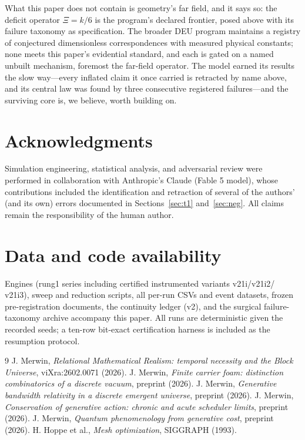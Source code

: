 \documentclass[11pt]{article}
\begin{document}
What this paper does not contain is geometry's far field, and it says so: the
deficit operator $\Xi=k/6$ is the program's declared frontier, posed above
with its failure taxonomy as specification. The broader DEU program maintains
a registry of conjectured dimensionless correspondences with measured
physical constants; none meets this paper's evidential standard, and each is
gated on a named unbuilt mechanism, foremost the far-field operator. The
model earned its results the slow way---every inflated claim it once carried
is retracted by name above, and its central law was found by three
consecutive registered failures---and the surviving core is, we believe,
worth building on.

\section*{Acknowledgments}
Simulation engineering, statistical analysis, and adversarial review were
performed in collaboration with Anthropic's Claude (Fable 5 model), whose
contributions included the identification and retraction of several of the
authors' (and its own) errors documented in Sections~\ref{sec:t1}
and~\ref{sec:neg}. All claims remain the responsibility of the human author.

\section*{Data and code availability}
Engines (rung1 series including certified instrumented variants v21i/v21i2/
v21i3), sweep and reduction scripts, all per-run CSVs and event datasets,
frozen pre-registration documents, the continuity ledger (v2), and the
surgical failure-taxonomy archive accompany this paper. All runs are
deterministic given the recorded seeds; a ten-row bit-exact certification
harness is included as the resumption protocol.

\begin{thebibliography}{9}
 J. Merwin, \emph{Relational Mathematical Realism: temporal
necessity and the Block Universe}, viXra:2602.0071 (2026).
 J. Merwin, \emph{Finite carrier foam: distinction combinatorics
of a discrete vacuum}, preprint (2026).
 J. Merwin, \emph{Generative bandwidth relativity in a discrete
emergent universe}, preprint (2026).
 J. Merwin, \emph{Conservation of generative action: chronic and
acute scheduler limits}, preprint (2026).
 J. Merwin, \emph{Quantum phenomenology from generative cost},
preprint (2026).
 H. Hoppe et al., \emph{Mesh optimization}, SIGGRAPH (1993).
\end{thebibliography}
\end{document}
